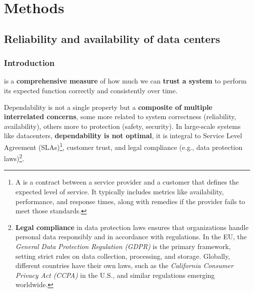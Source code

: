 \section{Methods}

\subsection{Reliability and availability of data centers}

\subsubsection{Introduction}\label{subsubsection: introduction - dependability}

 is a \textbf{comprehensive measure} of how much we can \textbf{trust a system} to perform its expected function correctly and consistently over time.

\highspace
Dependability is not a single property but a \textbf{composite of multiple interrelated concerns}, some more related to system correctness (reliability, availability), others more to protection (safety, security). In large-scale systems like datacenters, \textbf{dependability is not optimal}, it is integral to Service Level Agreement (SLAs)\footnote{%
    A  is a contract between a service provider and a customer that defines the expected level of service. It typically includes metrics like availability, performance, and response times, along with remedies if the provider fails to meet those standards.
}, customer trust, and legal compliance (e.g., data protection laws)\footnote{%
    \textbf{Legal compliance} in data protection laws ensures that organizations handle personal data responsibly and in accordance with regulations. In the EU, the \emph{General Data Protection Regulation (GDPR)} is the primary framework, setting strict rules on data collection, processing, and storage. Globally, different countries have their own laws, such as the \emph{California Consumer Privacy Act (CCPA)} in the U.S., and similar regulations emerging worldwide.
}.

